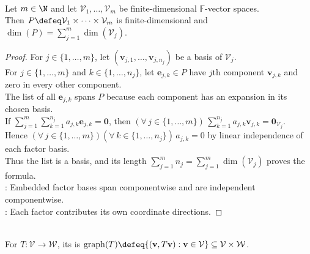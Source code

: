 \begin{theorem} \label{thm:dimension-of-product} \\
Let $m\in\N$ and let $\mathcal{V}_1,\ldots,\mathcal{V}_m$ be finite-dimensional $\mathbb{F}$-vector spaces.\\
Then $P\defeq\mathcal{V}_1\times\cdots\times\mathcal{V}_m$ is finite-dimensional and $\dim(P)=\sum\limits_{j=1}^{m}\dim(\mathcal{V}_j)$.
\begin{proof}
For $j\in\{1,\ldots,m\}$, let $(\mathbf{v}_{j,1},\ldots,\mathbf{v}_{j,n_j})$ be a basis of $\mathcal{V}_j$.\\
For $j\in\{1,\ldots,m\}$ and $k\in\{1,\ldots,n_j\}$, let $\mathbf{e}_{j,k}\in P$ have $j$th component $\mathbf{v}_{j,k}$ and zero in every other component.\\
The list of all $\mathbf{e}_{j,k}$ spans $P$ because each component has an expansion in its chosen basis.\\
If $\sum\limits_{j=1}^{m}\sum\limits_{k=1}^{n_j}a_{j,k}\mathbf{e}_{j,k}=\mathbf{0}$, then $(\forall\,j\in\{1,\ldots,m\})\,\sum\limits_{k=1}^{n_j}a_{j,k}\mathbf{v}_{j,k}=\mathbf{0}_{\mathcal{V}_j}$.\\
Hence $(\forall\,j\in\{1,\ldots,m\})(\forall\,k\in\{1,\ldots,n_j\})\,a_{j,k}=0$ by linear independence of each factor basis.\\
Thus the list is a basis, and its length $\sum\limits_{j=1}^{m}n_j=\sum\limits_{j=1}^{m}\dim(\mathcal{V}_j)$ proves the formula.\\
: Embedded factor bases span componentwise and are independent componentwise.\\
: Each factor contributes its own coordinate directions.
\end{proof}
\end{theorem}

\begin{definition} \label{def:graph-of-a-function} \\
For $T:\mathcal{V}\to\mathcal{W}$, its  is $\operatorname{graph}(T)\defeq\{(\mathbf{v},T\mathbf{v}):\mathbf{v}\in\mathcal{V}\}\subseteq\mathcal{V}\times\mathcal{W}$.
\end{definition}

